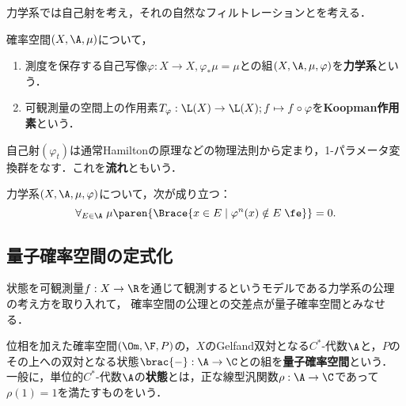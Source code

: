 \documentclass[uplatex,dvipdfmx]{jsreport}
\begin{document}
\begin{tcolorbox}[colframe=ForestGreen, colback=ForestGreen!10!white,breakable,colbacktitle=ForestGreen!40!white,coltitle=black,fonttitle=\bfseries\sffamily,
title=]
    力学系では自己射を考え，それの自然なフィルトレーションとを考える．
\end{tcolorbox}

\begin{definition}
    確率空間$(X,\A,\mu)$について，
    \begin{enumerate}
        \item 測度を保存する自己写像$\varphi:X\to X,\varphi_*\mu=\mu$との組$(X,\A,\mu,\varphi)$を\textbf{力学系}という．
        \item 可観測量の空間上の作用素$T_\varphi:\L(X)\to\L(X);f\mapsto f\circ\varphi$を\textbf{Koopman作用素}という．
    \end{enumerate}
\end{definition}
\begin{remarks}[flow]
    自己射$(\varphi_t)$は通常Hamiltonの原理などの物理法則から定まり，1-パラメータ変換群をなす．これを\textbf{流れ}ともいう．
\end{remarks}

\begin{theorem}
    力学系$(X,\A,\mu,\varphi)$について，次が成り立つ：
    \[\forall_{E\in\A}\;\mu\paren{\Brace{x\in E\mid \varphi^n(x)\notin E\;\fe}}=0.\]
\end{theorem}

\subsection{量子確率空間の定式化}

\begin{tcolorbox}[colframe=ForestGreen, colback=ForestGreen!10!white,breakable,colbacktitle=ForestGreen!40!white,coltitle=black,fonttitle=\bfseries\sffamily,
title=]
    状態を可観測量$f:X\to\R$を通じて観測するというモデルである力学系の公理の考え方を取り入れて，
    確率空間の公理との交差点が量子確率空間とみなせる．
\end{tcolorbox}

\begin{definition}
    位相を加えた確率空間$(\Om,\F,P)$の，$X$のGelfand双対となる$C^*$-代数$\A$と，$P$のその上への双対となる状態$\brac{-}:\A\to\C$との組を\textbf{量子確率空間}という．
    一般に，単位的$C^*$-代数$\A$の\textbf{状態}とは，正な線型汎関数$\rho:\A\to\C$であって$\rho(1)=1$を満たすものをいう．
\end{definition}
\end{document}
